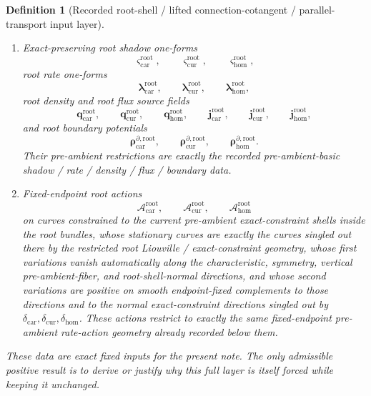 \documentclass[11pt]{article}
\newcommand{\TensorConstraintGap}{\delta_{\mathrm{car}}}
\newcommand{\CurConstraintGap}{\delta_{\mathrm{cur}}}
\newcommand{\HomConstraintGap}{\delta_{\mathrm{hom}}}
\newcommand{\TensorRootShadowForm}{\boldsymbol{\varsigma}_{\mathrm{car}}^{\mathrm{root}}}
\newcommand{\CurRootShadowForm}{\boldsymbol{\varsigma}_{\mathrm{cur}}^{\mathrm{root}}}
\newcommand{\HomRootShadowForm}{\boldsymbol{\varsigma}_{\mathrm{hom}}^{\mathrm{root}}}
\newcommand{\TensorRootRateForm}{\boldsymbol{\lambda}_{\mathrm{car}}^{\mathrm{root}}}
\newcommand{\CurRootRateForm}{\boldsymbol{\lambda}_{\mathrm{cur}}^{\mathrm{root}}}
\newcommand{\HomRootRateForm}{\boldsymbol{\lambda}_{\mathrm{hom}}^{\mathrm{root}}}
\newcommand{\TensorRootDensitySource}{\boldsymbol{q}_{\mathrm{car}}^{\mathrm{root}}}
\newcommand{\CurRootDensitySource}{\boldsymbol{q}_{\mathrm{cur}}^{\mathrm{root}}}
\newcommand{\HomRootDensitySource}{\boldsymbol{q}_{\mathrm{hom}}^{\mathrm{root}}}
\newcommand{\TensorRootFluxSource}{\boldsymbol{j}_{\mathrm{car}}^{\mathrm{root}}}
\newcommand{\CurRootFluxSource}{\boldsymbol{j}_{\mathrm{cur}}^{\mathrm{root}}}
\newcommand{\HomRootFluxSource}{\boldsymbol{j}_{\mathrm{hom}}^{\mathrm{root}}}
\newcommand{\TensorRootBoundarySource}{\boldsymbol{\rho}_{\mathrm{car}}^{\partial,\mathrm{root}}}
\newcommand{\CurRootBoundarySource}{\boldsymbol{\rho}_{\mathrm{cur}}^{\partial,\mathrm{root}}}
\newcommand{\HomRootBoundarySource}{\boldsymbol{\rho}_{\mathrm{hom}}^{\partial,\mathrm{root}}}
\newcommand{\TensorRootAction}{\mathscr A_{\mathrm{car}}^{\mathrm{root}}}
\newcommand{\CurRootAction}{\mathscr A_{\mathrm{cur}}^{\mathrm{root}}}
\newcommand{\HomRootAction}{\mathscr A_{\mathrm{hom}}^{\mathrm{root}}}
\newtheorem{definition}{Definition}
\begin{document}
\begin{definition}[Recorded root-shell / lifted connection-cotangent / parallel-transport input layer]
\begin{enumerate}
    \item Exact-preserving root shadow one-forms
    \[
    \TensorRootShadowForm,\qquad
    \CurRootShadowForm,\qquad
    \HomRootShadowForm,
    \]
    root rate one-forms
    \[
    \TensorRootRateForm,\qquad
    \CurRootRateForm,\qquad
    \HomRootRateForm,
    \]
    root density and root flux source fields
    \[
    \TensorRootDensitySource,\qquad
    \CurRootDensitySource,\qquad
    \HomRootDensitySource,\qquad
    \TensorRootFluxSource,\qquad
    \CurRootFluxSource,\qquad
    \HomRootFluxSource,
    \]
    and root boundary potentials
    \[
    \TensorRootBoundarySource,\qquad
    \CurRootBoundarySource,\qquad
    \HomRootBoundarySource.
    \]
    Their pre-ambient restrictions are exactly the recorded pre-ambient-basic shadow / rate / density / flux / boundary data.
    \item Fixed-endpoint root actions
    \[
    \TensorRootAction,\qquad
    \CurRootAction,\qquad
    \HomRootAction
    \]
    on curves constrained to the current pre-ambient exact-constraint shells inside the root bundles, whose stationary curves are exactly the curves singled out there by the restricted root Liouville / exact-constraint geometry, whose first variations vanish automatically along the characteristic, symmetry, vertical pre-ambient-fiber, and root-shell-normal directions, and whose second variations are positive on smooth endpoint-fixed complements to those directions and to the normal exact-constraint directions singled out by \(\TensorConstraintGap,\CurConstraintGap,\HomConstraintGap\). These actions restrict to exactly the same fixed-endpoint pre-ambient rate-action geometry already recorded below them.
\end{enumerate}
These data are exact fixed inputs for the present note. The only admissible positive result is to derive or justify why this full layer is itself forced while keeping it unchanged.
\end{definition}
\end{document}
